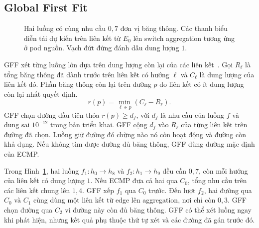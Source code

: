 \documentclass[conference,a4paper]{IEEEtran}
\newcommand{\widediagram}[3]{%
  \begin{figure}[!tp]\centering
  \caption{#2}\label{fig:#3}
  \end{figure}}
\begin{document}
\subsection{Global First Fit}
\widediagram{ecmp-gff}{Hai luồng có cùng nhu cầu \(0{,}7\) đơn vị băng thông. Các thanh biểu diễn tải dự kiến trên liên kết từ \(E_0\) lên switch aggregation tương ứng ở pod nguồn. Vạch đứt đứng đánh dấu dung lượng \(1\).}{ecmp-gff}
GFF xét từng luồng lớn dựa trên dung lượng còn lại của các liên kết~\cite{hedera}. Gọi \(R_\ell\) là tổng băng thông đã dành trước trên liên kết có hướng \(\ell\) và \(C_\ell\) là dung lượng của liên kết đó. Phần băng thông còn lại trên đường \(p\) do liên kết có ít dung lượng còn lại nhất quyết định.
\begin{equation}
  r(p)=\min_{\ell\in p}\left(C_\ell-R_\ell\right).
  \label{eq:gff-residual}
\end{equation}
GFF chọn đường đầu tiên thỏa \(r(p)\ge d_f\), với \(d_f\) là nhu cầu của luồng \(f\) và dung sai \(10^{-12}\) trong bản triển khai. GFF cộng \(d_f\) vào \(R_\ell\) của từng liên kết trên đường đã chọn. Luồng giữ đường đó chừng nào nó còn hoạt động và đường còn khả dụng. Nếu không tìm được đường đủ băng thông, GFF dùng đường mặc định của ECMP.

Trong Hình~\ref{fig:ecmp-gff}, hai luồng \(f_1:h_0\to h_8\) và \(f_2:h_1\to h_9\) đều cần \(0{,}7\), còn mỗi hướng của liên kết có dung lượng \(1\). Nếu ECMP đưa cả hai qua \(C_0\), tổng nhu cầu trên các liên kết chung lên \(1{,}4\). GFF xếp \(f_1\) qua \(C_0\) trước. Đến lượt \(f_2\), hai đường qua \(C_0\) và \(C_1\) cùng dùng một liên kết từ edge lên aggregation, nơi chỉ còn \(0{,}3\). GFF chọn đường qua \(C_2\) vì đường này còn đủ băng thông. GFF có thể xét luồng ngay khi phát hiện, nhưng kết quả phụ thuộc thứ tự xét và các đường đã gán trước đó.
\end{document}
